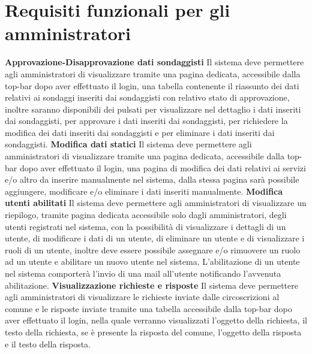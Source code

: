     \section{Requisiti funzionali per gli amministratori}
        \begin{rfList}
            \rfItem \textbf{Approvazione-Disapprovazione dati sondaggisti} Il sistema deve permettere agli amministratori di visualizzare tramite una pagina dedicata, accessibile dalla top-bar dopo aver effettuato il login, una tabella contenente il riassunto dei dati relativi ai sondaggi inseriti dai sondaggisti con relativo stato di approvazione, inoltre saranno disponibili dei pulsati per visualizzare nel dettaglio i dati inseriti dai sondaggisti, per approvare i dati inseriti dai sondaggisti, per richiedere la modifica dei dati inseriti dai sondaggisti e per eliminare i dati inseriti dai sondaggisti.
            \rfItem \textbf{Modifica dati statici} Il sistema deve permettere agli amministratori di visualizzare tramite una pagina dedicata, accessibile dalla top-bar dopo aver effettuato il login, una pagina di modifica dei dati relativi ai servizi e/o altro da inserire manualmente nel sistema, dalla stessa pagina sarà possibile aggiungere, modificare e/o eliminare i dati inseriti manualmente.
            \rfItem \textbf{Modifica utenti abilitati} Il sistema deve permettere agli amministratori di visualizzare un riepilogo, tramite pagina dedicata accessibile solo dagli amministratori, degli utenti registrati nel sistema, con la possibilità di visualizzare i dettagli di un utente, di modificare i dati di un utente, di eliminare un utente e di visualizzare i ruoli di un utente, inoltre deve essere possibile assegnare e/o rimuovere un ruolo ad un utente e abilitare un nuovo utente nel sistema. L'abilitazione di un utente nel sistema comporterà l'invio di una mail all'utente notificando l'avvenuta abilitazione.
            \rfItem \textbf{Visualizzazione richieste e risposte} Il sistema deve permettere agli amministratori di visualizzare le richieste inviate dalle circoscrizioni al comune e le risposte inviate tramite una tabella accessibile dalla top-bar dopo aver effettuato il login, nella quale verranno visualizzati l'oggetto della richiesta, il testo della richiesta, se è presente la risposta del comune, l'oggetto della risposta e il testo della risposta.
        \end{rfList}
